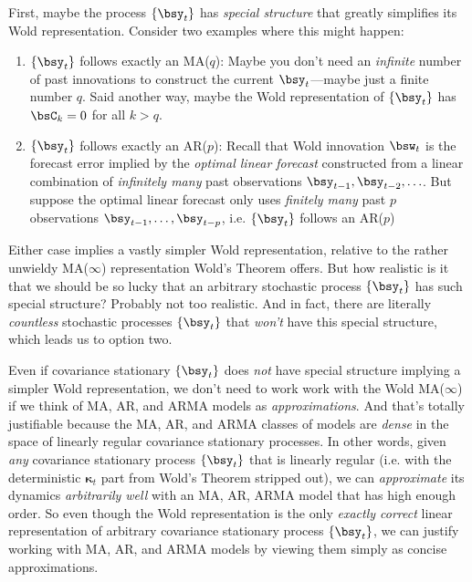 \documentclass[12pt]{article}
\theoremstyle{plain}
\theoremstyle{definition}
\theoremstyle{remark}
\newcommand{\bskappa}{\boldsymbol{\kappa}}
\begin{document}
First, maybe the process $\{\bsy_t\}$ has \emph{special structure}
that greatly simplifies its Wold representation.
Consider two examples where this might happen:
\begin{enumerate}
  \item $\{\bsy_t\}$ follows exactly an MA($q$):
    Maybe you don't need an \emph{infinite} number of past innovations
    to construct the current $\bsy_t$---maybe just a finite number $q$.
    Said another way, maybe the Wold representation of $\{\bsy_t\}$ has
    $\bsC_k=0$ for all $k>q$.
  \item $\{\bsy_t\}$ follows exactly an AR($p$):
    Recall that Wold innovation $\bsw_t$ is the forecast error implied
    by the \emph{optimal linear forecast} constructed from a linear
    combination of \emph{infinitely many} past observations
    $\bsy_{t-1},\bsy_{t-2},\ldots$.
    But suppose the optimal linear forecast only uses
    \emph{finitely many} past $p$ observations
    $\bsy_{t-1},\ldots,\bsy_{t-p}$, i.e. $\{\bsy_t\}$ follows an AR($p$)
\end{enumerate}
Either case implies a vastly simpler Wold representation, relative to the
rather unwieldy MA($\infty$) representation Wold's Theorem offers.
But how realistic is it that we should be so lucky that an arbitrary
stochastic process $\{\bsy_t\}$ has such special structure?  Probably
not too realistic.
And in fact, there are literally \emph{countless} stochastic processes
$\{\bsy_t\}$ that \emph{won't} have this special structure, which leads
us to option two.

Even if covariance stationary $\{\bsy_t\}$ does \emph{not} have special
structure implying a simpler Wold representation, we don't need to work
work with the Wold MA($\infty$) if we think of MA, AR, and ARMA models
as \emph{approximations}.
And that's totally justifiable because the MA, AR, and ARMA classes of
models are \emph{dense} in the space of linearly regular covariance
stationary processes. In other words, given \emph{any} covariance
stationary process $\{\bsy_t\}$ that is linearly regular (i.e. with the
deterministic $\bskappa_t$ part from Wold's Theorem stripped out),
we can \emph{approximate} its dynamics \emph{arbitrarily well} with an
MA, AR, ARMA model that has high enough order.
So even though the Wold representation is the only \emph{exactly
correct} linear representation of arbitrary covariance stationary
process $\{\bsy_t\}$, we can justify working with MA, AR, and
ARMA models by viewing them simply as concise approximations.
\end{document}
